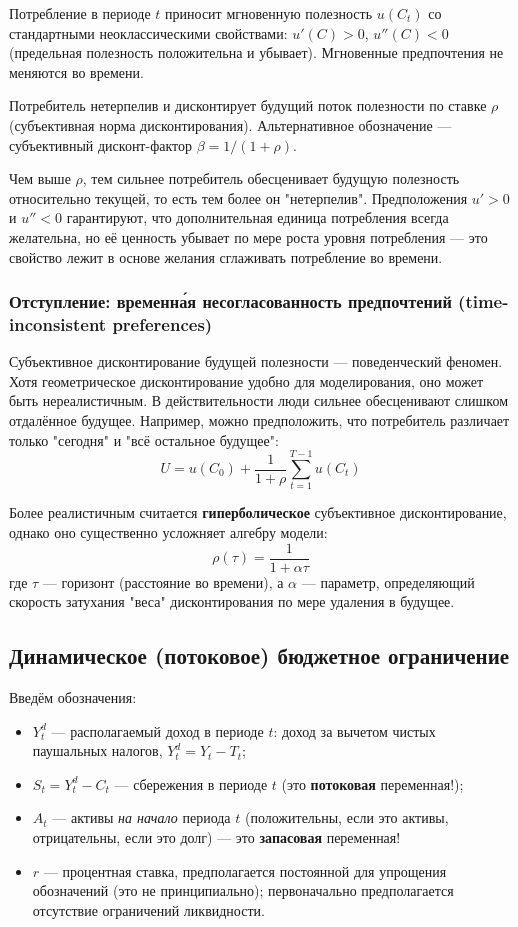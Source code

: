 \documentclass[10pt,a4paper]{article}
\begin{document}
Потребление в периоде $t$ приносит мгновенную полезность $u(C_t)$ со стандартными неоклассическими свойствами: $u'(C) > 0$, $u''(C) < 0$ (предельная полезность положительна и убывает). Мгновенные предпочтения не меняются во времени.
 
Потребитель нетерпелив и дисконтирует будущий поток полезности по ставке $\rho$ (субъективная норма дисконтирования). Альтернативное обозначение — субъективный дисконт-фактор $\beta = 1/(1+\rho)$.
 
\begin{intuition}
Чем выше $\rho$, тем сильнее потребитель обесценивает будущую полезность относительно текущей, то есть тем более он "нетерпелив". Предположения $u'>0$ и $u''<0$ гарантируют, что дополнительная единица потребления всегда желательна, но её ценность убывает по мере роста уровня потребления — это свойство лежит в основе желания сглаживать потребление во времени.
\end{intuition}
 
\subsubsection*{Отступление: временн\'ая несогласованность предпочтений (time-inconsistent preferences)}
 
Субъективное дисконтирование будущей полезности — поведенческий феномен. Хотя геометрическое дисконтирование удобно для моделирования, оно может быть нереалистичным. В действительности люди сильнее обесценивают слишком отдалённое будущее. Например, можно предположить, что потребитель различает только "сегодня" и "всё остальное будущее":
\[
U = u(C_0) + \frac{1}{1+\rho}\sum_{t=1}^{T-1} u(C_t)
\]
 
Более реалистичным считается \textbf{гиперболическое} субъективное дисконтирование, однако оно существенно усложняет алгебру модели:
\[
\rho(\tau) = \frac{1}{1+\alpha\tau}
\]
где $\tau$ — горизонт (расстояние во времени), а $\alpha$ — параметр, определяющий скорость затухания "веса" дисконтирования по мере удаления в будущее.
 
\subsection{Динамическое (потоковое) бюджетное ограничение}
 
Введём обозначения:
\begin{itemize}
\item $Y_t^d$ — располагаемый доход в периоде $t$: доход за вычетом чистых паушальных налогов, $Y_t^d = Y_t - T_t$;
\item $S_t = Y_t^d - C_t$ — сбережения в периоде $t$ (это \textbf{потоковая} переменная!);
\item $A_t$ — активы \textit{на начало} периода $t$ (положительны, если это активы, отрицательны, если это долг) — это \textbf{запасовая} переменная!
\item $r$ — процентная ставка, предполагается постоянной для упрощения обозначений (это не принципиально); первоначально предполагается отсутствие ограничений ликвидности.
\end{itemize}
 
\end{document}
